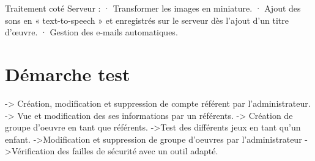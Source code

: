 \documentclass[12pt,a4paper]{report}
\begin{document}
Traitement coté Serveur :
·         Transformer les images en miniature.
·         Ajout des sons en « text-to-speech » et enregistrés sur le serveur dès l’ajout d’un titre d’œuvre.
·         Gestion des e-mails automatiques.

\chapter{Démarche test}
-> Création, modification et suppression de compte référent par l’administrateur.
-> Vue et modification des ses informations par un référents.
-> Création de groupe d’oeuvre en tant que référents. 
->Test des différents jeux en tant qu’un enfant.
->Modification et suppression de groupe d’oeuvres par l’administrateur
->Vérification des failles de sécurité avec un outil adapté.
\end{document}
